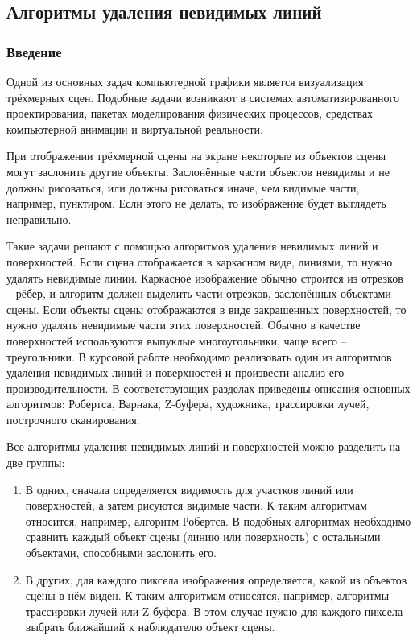 \subsection{Алгоритмы удаления невидимых линий}

\subsubsection{Введение}

\hspace{1.25cm}
Одной из основных задач компьютерной графики является визуализация трёхмерных сцен. Подобные задачи возникают в системах автоматизированного проектирования, пакетах моделирования физических процессов, средствах компьютерной анимации и виртуальной реальности.

При отображении трёхмерной сцены на экране некоторые из объектов сцены могут заслонить другие объекты. Заслонённые части объектов невидимы и не должны рисоваться, или должны рисоваться иначе, чем видимые части, например, пунктиром. Если этого не делать, то изображение будет выглядеть неправильно.

Такие задачи решают с помощью алгоритмов удаления невидимых линий и поверхностей. Если сцена отображается в каркасном виде, линиями, то нужно удалять невидимые линии. Каркасное изображение обычно строится из отрезков – рёбер, и алгоритм должен выделить части отрезков, заслонённых объектами сцены. Если объекты сцены отображаются в виде закрашенных поверхностей, то нужно удалять невидимые части этих поверхностей. Обычно в качестве поверхностей используются выпуклые многоугольники, чаще всего – треугольники.
В курсовой работе необходимо реализовать один из алгоритмов удаления невидимых линий и поверхностей и произвести анализ его производительности. В соответствующих разделах приведены описания основных алгоритмов: Робертса, Варнака, Z-буфера, художника, трассировки лучей, построчного сканирования.

Все алгоритмы удаления невидимых линий и поверхностей можно разделить на две группы:

\begin{enumerate}
	\item В одних, сначала определяется видимость для участков линий или поверхностей, а затем рисуются видимые части. К таким алгоритмам относится, например, алгоритм Робертса. В подобных алгоритмах необходимо сравнить каждый объект сцены (линию или поверхность) с остальными объектами, способными заслонить его.
	\item В других, для каждого пиксела изображения определяется, какой из объектов сцены в нём виден. К таким алгоритмам относятся, например, алгоритмы трассировки лучей или Z-буфера. В этом случае нужно для каждого пиксела выбрать ближайший к наблюдателю объект сцены.
\end{enumerate}

